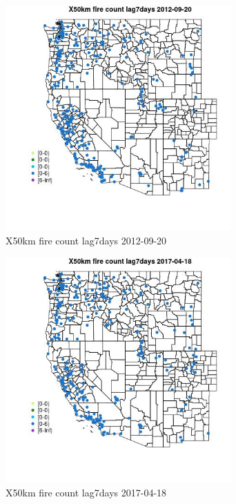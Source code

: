 \begin{figure} 
\centering  
\includegraphics[width=0.77\textwidth]{Code_Outputs/Report_ML_input_PM25_Step4_part_e_de_duplicated_aves_compiled_2019-05-14wNAs_MapObsX50km_fire_count_lag7days2012-09-20.jpg} 
\caption{\label{fig:Report_ML_input_PM25_Step4_part_e_de_duplicated_aves_compiled_2019-05-14wNAsMapObsX50km_fire_count_lag7days2012-09-20}X50km fire count lag7days 2012-09-20} 
\end{figure} 
 

\clearpage 

\begin{figure} 
\centering  
\includegraphics[width=0.77\textwidth]{Code_Outputs/Report_ML_input_PM25_Step4_part_e_de_duplicated_aves_compiled_2019-05-14wNAs_MapObsX50km_fire_count_lag7days2017-04-18.jpg} 
\caption{\label{fig:Report_ML_input_PM25_Step4_part_e_de_duplicated_aves_compiled_2019-05-14wNAsMapObsX50km_fire_count_lag7days2017-04-18}X50km fire count lag7days 2017-04-18} 
\end{figure} 
 

